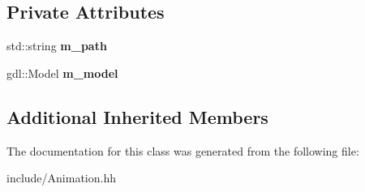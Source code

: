 \subsection*{Private Attributes}
\begin{DoxyCompactItemize}
\item 
\hypertarget{class_animation_a7c64c9a119558fc91605641c747f64b0}{}std\+::string {\bfseries m\+\_\+path}\label{class_animation_a7c64c9a119558fc91605641c747f64b0}

\item 
\hypertarget{class_animation_ad7da4193700ad1654e3ee3e843d97141}{}gdl\+::\+Model {\bfseries m\+\_\+model}\label{class_animation_ad7da4193700ad1654e3ee3e843d97141}

\end{DoxyCompactItemize}
\subsection*{Additional Inherited Members}


The documentation for this class was generated from the following file\+:\begin{DoxyCompactItemize}
\item 
include/Animation.\+hh\end{DoxyCompactItemize}
